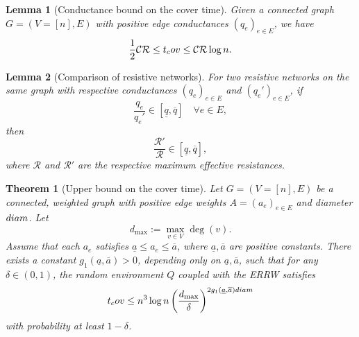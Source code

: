 \documentclass[10pt,a4paper]{amsart}
\newtheorem{lem}{Lemma}
\newtheorem{thm}{Theorem}
\newcommand{\cov}{\textnormal{cov}}
\newcommand{\diam}{\textnormal{diam}}
\newcommand{\mc}{\mathcal{C}}
\newcommand{\mr}{\mathcal{R}}
\begin{document}
\begin{lem}[Conductance bound on the cover time]
\label{lem:cond_cover}
Given a connected graph $G=(V=[n], E)$ with positive edge conductances $(q_e)_{e\in E}$, we have
\[\frac{1}{2}\mc\mr\leq t_\cov\leq \mc\mr \log n.\]
\end{lem}

\begin{lem}[Comparison of resistive networks]
\label{lem:comp_res}
For two resistive networks on the same graph with respective conductances \( (q_e)_{e \in E} \) and \( (q_e')_{e \in E} \), if
\[
\frac{q_e}{q_e'} \in [\underline{q}, \overline{q}] \quad \forall e \in E,
\]
then
\[
\frac{\mathcal{R}'}{\mathcal{R}} \in [\underline{q}, \overline{q}],
\]
where \( \mathcal{R} \) and \( \mathcal{R}' \) are the respective maximum effective resistances.
\end{lem}

\begin{thm}[Upper bound on the cover time]
\label{thm:bound_cover}
Let $G=(V=[n],E)$ be a connected, weighted graph with positive edge weights
$A=(a_e)_{e\in E}$ and diameter $\diam$. Let
\[
d_{\max}:=\max_{v\in V}\deg(v).
\]
Assume that each $a_e$ satisfies $\underline a\le a_e\le \overline a$, where
$\underline a,\overline a$ are positive constants. There exists a constant \(g_1(\underline a,\overline a)>0\), depending only on
\(\underline a,\overline a\), such that for any \(\delta\in(0,1)\), the random environment $Q$ coupled with the ERRW satisfies
\[
t_\cov
\le
n^3\log n
\left(\frac{d_{\max}}{\delta}\right)^{2g_1(\underline a,\overline a)\diam}
\]
with probability at least $1-\delta$.
\end{thm}
\end{document}

